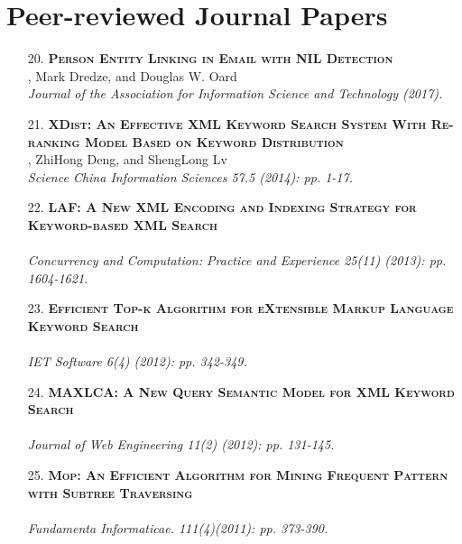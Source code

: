 \documentclass[a4paper, 11pt]{article}
\begin{document}
\section{Peer-reviewed Journal Papers}
\begin{itemize}

\item[\color{bl3} 20.]{\scshape\color{bl3}\bf Person Entity Linking in Email with NIL Detection}\\
, Mark Dredze, and Douglas W. Oard\\
\emph{Journal of the Association for Information Science and Technology (2017).}
\vspace{2mm}

\item[\color{bl3} 21.]{\scshape\color{bl3}\bf XDist: An Effective XML Keyword Search System With Re-ranking Model Based on Keyword Distribution}\\
, ZhiHong Deng, and ShengLong Lv\\
\emph{Science China Information Sciences 57.5 (2014): pp. 1-17.}
\vspace{2mm}

\item[\color{bl3} 22.]{\scshape\color{bl3}\bf  LAF: A New XML Encoding and Indexing Strategy for Keyword-based XML Search}\\
\\
\emph{ Concurrency and Computation: Practice and Experience 25(11) (2013): pp. 1604-1621.}
\vspace{2mm}

\item[\color{bl3} 23.]{\scshape\color{bl3}\bf  Efficient Top-k Algorithm for eXtensible Markup Language Keyword Search}\\
\\
\emph{IET Software 6(4) (2012): pp. 342-349.}
\vspace{2mm}

\item[\color{bl3} 24.]{\scshape\color{bl3}\bf MAXLCA: A New Query Semantic Model for XML Keyword Search}\\
\\
\emph{Journal of Web Engineering 11(2) (2012): pp. 131-145.}
\vspace{2mm}

\item[\color{bl3} 25.]{\scshape\color{bl3}\bf Mop: An Efficient Algorithm for Mining Frequent Pattern with Subtree Traversing}\\
\\
\emph{ Fundamenta Informaticae. 111(4)(2011): pp. 373-390.}
\vspace{2mm}


\end{itemize}
\end{document}
